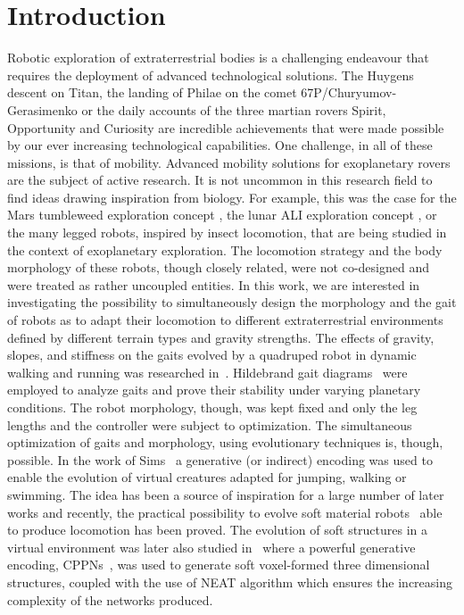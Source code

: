 \documentclass{sig-alternate}
\begin{document}
\printccsdesc


\section{Introduction}
Robotic exploration of extraterrestrial bodies is a challenging endeavour that requires the deployment of advanced technological solutions. The Huygens descent on Titan, the landing of Philae on the comet 67P/Churyumov-Gerasimenko or the daily accounts of the three martian rovers Spirit, Opportunity and Curiosity are incredible achievements that were made possible by our ever increasing technological capabilities. One challenge, in all of these missions, is that of mobility. Advanced mobility solutions for exoplanetary rovers are the subject of active research. It is not uncommon in this research field to find ideas drawing inspiration from biology. For example, this was the case for the Mars tumbleweed exploration concept \cite{antol2003low, ylikorpi2004biologically}, the lunar ALI exploration concept \cite{clark2005ali}, or the many legged robots, inspired by insect locomotion, that are being studied in the context of exoplanetary exploration. The locomotion strategy and the body morphology of these robots, though closely related, were not co-designed and were treated as rather uncoupled entities. In this work, we are interested in investigating the possibility to simultaneously design the morphology and the gait of robots as to adapt their locomotion to different extraterrestrial environments defined by different terrain types and gravity strengths. The effects of gravity, slopes, and stiffness on the gaits evolved by a quadruped robot in dynamic walking and running was researched in~\cite{papadopoulos2013ariadna, kontolatisquadruped}. Hildebrand gait diagrams~\cite{Hildebrand1989-HILVLA} were employed to analyze gaits and prove their stability under varying planetary conditions. The robot morphology, though, was kept fixed and only the leg lengths and the controller were subject to optimization. The simultaneous optimization of gaits and morphology, using evolutionary techniques is, though, possible. In the work of Sims~\cite{sims1994evolving} a generative (or indirect) encoding was used to enable the evolution of virtual creatures adapted for jumping, walking or swimming. The idea has been a source of inspiration for a large number of later works and recently, the practical possibility to evolve soft material robots~\cite{hiller2012automatic} able to produce locomotion has been proved. The evolution of soft structures in a virtual environment was later also studied in~\cite{cheney2013unshackling} where a powerful generative encoding, CPPNs~\cite{stanley2007compositional}, was used to generate soft voxel-formed three dimensional structures, coupled with the use of NEAT algorithm which ensures the increasing complexity of the networks produced.  
\end{document}
